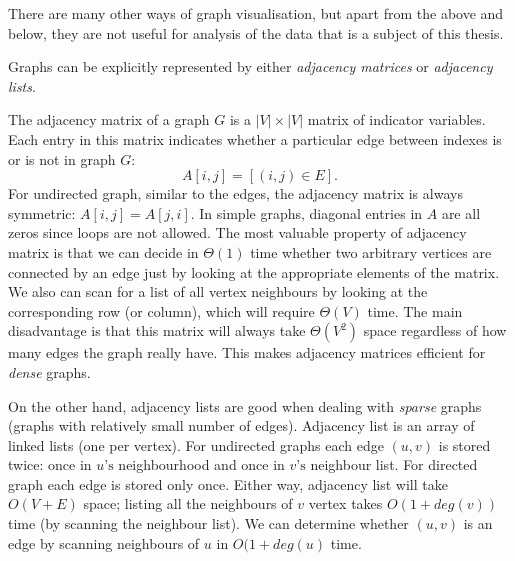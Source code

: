     There are many other ways of graph visualisation, but apart from the above and below, they are not useful for analysis of the data that is a subject of this thesis.

    Graphs can be explicitly represented by either \emph{adjacency matrices} or \emph{adjacency lists}.
        
    The adjacency matrix of a graph $G$ is a $|V| \times |V|$ matrix of indicator variables. Each entry in this matrix indicates whether a particular edge between indexes is or is not in graph $G$:
    $$ A[i, j] = [(i, j) \in E] \mbox{.} $$
    For undirected graph, similar to the edges, the adjacency matrix is always symmetric: $A[i, j] = A[j, i]$. In simple graphs, diagonal entries in $A$ are all zeros since loops are not allowed. The most valuable property of adjacency matrix is that we can decide in $\Theta(1)$ time whether two arbitrary vertices are connected by an edge just by looking at the appropriate elements of the matrix. We also can scan for a list of all vertex neighbours by looking at the corresponding row (or column), which will require $\Theta(V)$ time. The main disadvantage is that this matrix will always take $\Theta(V^2)$ space regardless of how many edges the graph really have. This makes adjacency matrices efficient for \emph{dense} graphs.

    On the other hand, adjacency lists are good when dealing with \emph{sparse} graphs (graphs with relatively small number of edges). Adjacency list is an array of linked lists (one per vertex). For undirected graphs each edge $(u, v)$ is stored twice: once in $u\mbox{'s}$ neighbourhood and once in $v\mbox{'s}$ neighbour list. For directed graph each edge is stored only once. Either way, adjacency list will take $O(V+E)$ space; listing all the neighbours of $v$ vertex takes $O(1+deg(v))$ time (by scanning the neighbour list). We can determine whether $(u, v)$ is an edge by scanning neighbours of $u$ in $O(1+deg(u)$ time.

